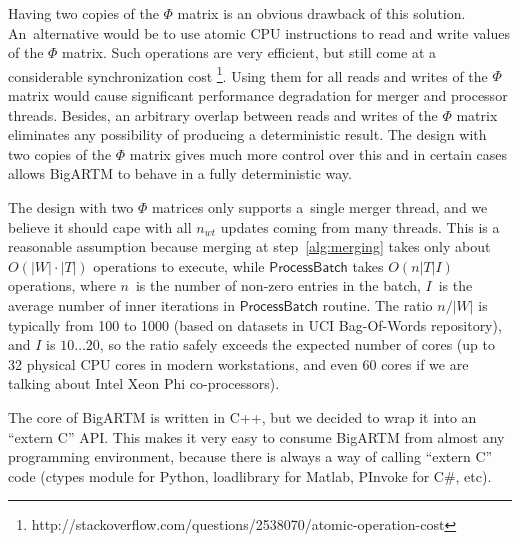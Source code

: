 \documentclass{llncs}
\newcommand{\kw}[1]{\textsf{#1}}
\begin{document}
Having two copies of the $\Phi$ matrix is an obvious drawback of this solution.
An~alternative would be to use atomic CPU instructions to read and write values of the $\Phi$ matrix.
Such operations are very efficient, but still come at a considerable synchronization cost%
\footnote{http://stackoverflow.com/questions/2538070/atomic-operation-cost}.
Using them for all reads and writes of the $\Phi$ matrix would cause significant performance degradation for merger and processor threads.
Besides, an arbitrary overlap between reads and writes of the $\Phi$ matrix eliminates any possibility of producing a deterministic result.
The design with two copies of the $\Phi$ matrix gives much more control over this
and in certain cases allows BigARTM to behave in a fully deterministic way.

The design with two $\Phi$ matrices only supports a~single merger thread,
and we believe it should cape with all $n_{wt}$ updates coming from many threads.
This is a reasonable assumption because
merging at step~\ref{alg:merging} takes only about $O(|W|\cdot|T|)$ operations to execute, while
$\kw{ProcessBatch}$ takes $O(n |T| I)$ operations,
where
$n$~is the number of non-zero entries in the batch,
$I$~is the average number of inner iterations in $\kw{ProcessBatch}$ routine.
The ratio $n / |W|$ is typically from 100 to 1000 (based on datasets in UCI Bag-Of-Words repository),
and $I$ is $10 \dots 20$, so the ratio safely exceeds the expected number of cores
(up to 32 physical CPU cores in modern workstations, and even 60 cores if we are talking about Intel Xeon Phi co-processors).



The core of BigARTM is written in C++, but we decided to wrap it into an ``extern C'' API.
This makes it very easy to consume BigARTM from almost any programming environment,
because there is always a way of calling ``extern C'' code
(ctypes module for Python, loadlibrary for Matlab, PInvoke for C\#, etc).
\end{document}
